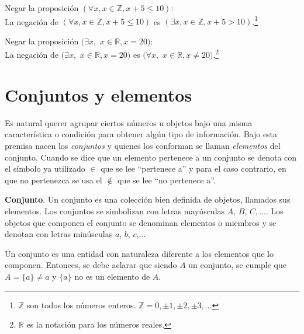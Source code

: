 \begin{myexample}
Negar la proposición  $(\forall x,x\in \mathbb{Z},x+5\leq 10)$: \\

La negación de $(\forall x,x\in \mathbb{Z},x+5\leq 10)$ es $(\exists x,x\in \mathbb{Z},x+5>10)$.\footnote{$\mathbb{Z}$ son todos los números enteros. $\mathbb{Z}=0,\pm 1,\pm 2, \pm 3,...$}
\end{myexample}

\begin{myexample}
Negar la proposición  $(\exists x,$ $x\in\mathbb{R}, x=20)$: \\

La negación de $(\exists x,$ $x\in\mathbb{R}, x=20)$ es  $(\forall x,$ $x\in\mathbb{R}, x\neq 20)$.\footnote{$\mathbb{R}$ es la notación para los números reales.}
\end{myexample}
\newpage
\section{Conjuntos y elementos}
\label{CyE}

Es natural querer agrupar ciertos números u objetos bajo una misma característica o condición para obtener algún tipo de información. Bajo esta premisa nacen los \textit{conjuntos} y quienes los conforman se llaman \textit{elementos} del conjunto. Cuando se dice que un elemento pertenece a un conjunto se denota con el símbolo ya utilizado $\in$ que se lee ``pertenece a'' y para el caso contrario, en que no pertenezca se usa el $\notin$ que se lee ``no pertenece a''.

\begin{mydef}
\textbf{Conjunto}. Un conjunto es una colección bien definida de objetos, llamados sus elementos. Los conjuntos se simbolizan con letras mayúsculas $A$, $B$, $C,...$. Los objetos que componen el conjunto se denominan elementos o miembros y se denotan con letras minúsculas $a$, $b$, $c$,$...$
\end{mydef}

Un conjunto es una entidad con naturaleza diferente a los elementos que lo componen. Entonces, se debe aclarar que siendo $A$ un conjunto, se cumple que $A=\{a\}\neq a$ y $\{a\}$ no es un elemento de $A$.\\

